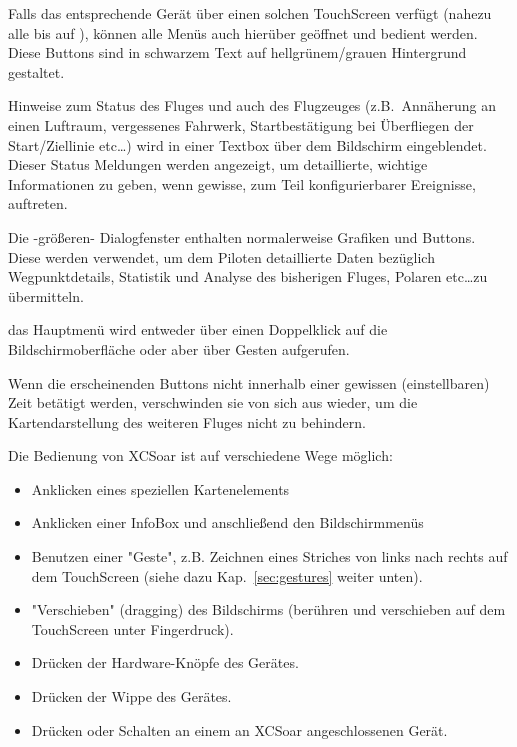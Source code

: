 \begin{description}
Falls das entsprechende Gerät über einen solchen TouchScreen verfügt (nahezu alle bis auf \al), können alle Menüs auch
hierüber geöffnet und bedient werden. Diese Buttons sind in schwarzem Text auf hellgrünem/grauen Hintergrund gestaltet.
%
\item[\p{Status Meldungen}] Hinweise zum Status des Fluges und auch des Flugzeuges  (z.B.\ Annäherung an einen Luftraum, vergessenes Fahrwerk, Startbestätigung bei Überfliegen der Start/Ziellinie etc\dots ) wird in einer Textbox  über dem Bildschirm eingeblendet.
Dieser Status Meldungen werden angezeigt, um detaillierte, wichtige Informationen zu geben, wenn gewisse, zum Teil konfigurierbarer Ereignisse, auftreten.
%
\item[\p{Dialog Fenster}] Die -größeren- Dialogfenster enthalten normalerweise Grafiken und Buttons. Diese werden verwendet, um dem Piloten  detaillierte Daten bezüglich Wegpunktdetails, Statistik und Analyse des bisherigen Fluges, Polaren etc\dots  zu übermitteln.

\item[\p{Hauptmenü}] das Hauptmenü wird entweder über einen Doppelklick auf die Bildschirmoberfläche oder aber über Gesten  aufgerufen.

   Wenn die erscheinenden Buttons nicht innerhalb einer gewissen (einstellbaren) Zeit  betätigt  werden, verschwinden sie von sich aus wieder, um die Kartendarstellung des weiteren Fluges nicht zu behindern.
\end{description}

Die Bedienung von \textsf{XCSoar} ist auf verschiedene Wege möglich:

\begin{itemize}
\item Anklicken eines speziellen Kartenelements
\item Anklicken einer InfoBox und anschließend den Bildschirmmenüs
\item Benutzen einer "Geste", z.B. Zeichnen eines Striches von links nach rechts auf dem TouchScreen
 (siehe dazu Kap.~\ref{sec:gestures} weiter unten).
\item "Verschieben" (dragging) des Bildschirms (berühren und verschieben auf dem TouchScreen unter Fingerdruck).
\item Drücken der Hardware-Knöpfe des  Gerätes.
\item Drücken der Wippe des Gerätes.
\item Drücken  oder Schalten  an einem an \textsf{XCSoar} angeschlossenen Gerät.
\end{itemize}

